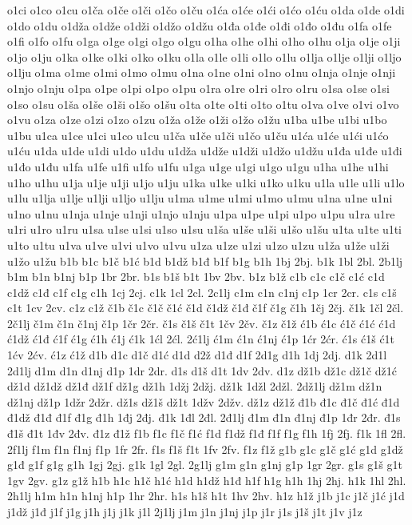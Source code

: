 {o1ci
o1co
o1cu
o1ča
o1če
o1či
o1čo
o1ču
o1ća
o1će
o1ći
o1ćo
o1ću
o1da
o1de
o1di
o1do
o1du
o1dža
o1dže
o1dži
o1džo
o1džu
o1đa
o1đe
o1đi
o1đo
o1đu
o1fa
o1fe
o1fi
o1fo
o1fu
o1ga
o1ge
o1gi
o1go
o1gu
o1ha
o1he
o1hi
o1ho
o1hu
o1ja
o1je
o1ji
o1jo
o1ju
o1ka
o1ke
o1ki
o1ko
o1ku
o1la
o1le
o1li
o1lo
o1lu
o1lja
o1lje
o1lji
o1ljo
o1lju
o1ma
o1me
o1mi
o1mo
o1mu
o1na
o1ne
o1ni
o1no
o1nu
o1nja
o1nje
o1nji
o1njo
o1nju
o1pa
o1pe
o1pi
o1po
o1pu
o1ra
o1re
o1ri
o1ro
o1ru
o1sa
o1se
o1si
o1so
o1su
o1ša
o1še
o1ši
o1šo
o1šu
o1ta
o1te
o1ti
o1to
o1tu
o1va
o1ve
o1vi
o1vo
o1vu
o1za
o1ze
o1zi
o1zo
o1zu
o1ža
o1že
o1ži
o1žo
o1žu
u1ba
u1be
u1bi
u1bo
u1bu
u1ca
u1ce
u1ci
u1co
u1cu
u1ča
u1če
u1či
u1čo
u1ču
u1ća
u1će
u1ći
u1ćo
u1ću
u1da
u1de
u1di
u1do
u1du
u1dža
u1dže
u1dži
u1džo
u1džu
u1đa
u1đe
u1đi
u1đo
u1đu
u1fa
u1fe
u1fi
u1fo
u1fu
u1ga
u1ge
u1gi
u1go
u1gu
u1ha
u1he
u1hi
u1ho
u1hu
u1ja
u1je
u1ji
u1jo
u1ju
u1ka
u1ke
u1ki
u1ko
u1ku
u1la
u1le
u1li
u1lo
u1lu
u1lja
u1lje
u1lji
u1ljo
u1lju
u1ma
u1me
u1mi
u1mo
u1mu
u1na
u1ne
u1ni
u1no
u1nu
u1nja
u1nje
u1nji
u1njo
u1nju
u1pa
u1pe
u1pi
u1po
u1pu
u1ra
u1re
u1ri
u1ro
u1ru
u1sa
u1se
u1si
u1so
u1su
u1ša
u1še
u1ši
u1šo
u1šu
u1ta
u1te
u1ti
u1to
u1tu
u1va
u1ve
u1vi
u1vo
u1vu
u1za
u1ze
u1zi
u1zo
u1zu
u1ža
u1že
u1ži
u1žo
u1žu
b1b
b1c
b1č
b1ć
b1d
b1dž
b1đ
b1f
b1g
b1h
1bj
2bj.
b1k
1bl
2bl.
2b1lj
b1m
b1n
b1nj
b1p
1br
2br.
b1s
b1š
b1t
1bv
2bv.
b1z
b1ž
c1b
c1c
c1č
c1ć
c1d
c1dž
c1đ
c1f
c1g
c1h
1cj
2cj.
c1k
1cl
2cl.
2c1lj
c1m
c1n
c1nj
c1p
1cr
2cr.
c1s
c1š
c1t
1cv
2cv.
c1z
c1ž
č1b
č1c
č1č
č1ć
č1d
č1dž
č1đ
č1f
č1g
č1h
1čj
2čj.
č1k
1čl
2čl.
2č1lj
č1m
č1n
č1nj
č1p
1čr
2čr.
č1s
č1š
č1t
1čv
2čv.
č1z
č1ž
ć1b
ć1c
ć1č
ć1ć
ć1d
ć1dž
ć1đ
ć1f
ć1g
ć1h
ć1j
ć1k
1ćl
2ćl.
2ć1lj
ć1m
ć1n
ć1nj
ć1p
1ćr
2ćr.
ć1s
ć1š
ć1t
1ćv
2ćv.
ć1z
ć1ž
d1b
d1c
d1č
d1ć
d1d
d2ž
d1đ
d1f
2d1g
d1h
1dj
2dj.
d1k
2d1l
2d1lj
d1m
d1n
d1nj
d1p
1dr
2dr.
d1s
d1š
d1t
1dv
2dv.
d1z
dž1b
dž1c
dž1č
dž1ć
dž1d
dž1dž
dž1đ
dž1f
dž1g
dž1h
1džj
2džj.
dž1k
1džl
2džl.
2dž1lj
dž1m
dž1n
dž1nj
dž1p
1džr
2džr.
dž1s
dž1š
dž1t
1džv
2džv.
dž1z
dž1ž
đ1b
đ1c
đ1č
đ1ć
đ1d
đ1dž
đ1đ
đ1f
đ1g
đ1h
1đj
2đj.
đ1k
1đl
2đl.
2đ1lj
đ1m
đ1n
đ1nj
đ1p
1đr
2đr.
đ1s
đ1š
đ1t
1đv
2đv.
đ1z
đ1ž
f1b
f1c
f1č
f1ć
f1d
f1dž
f1đ
f1f
f1g
f1h
1fj
2fj.
f1k
1fl
2fl.
2f1lj
f1m
f1n
f1nj
f1p
1fr
2fr.
f1s
f1š
f1t
1fv
2fv.
f1z
f1ž
g1b
g1c
g1č
g1ć
g1d
g1dž
g1đ
g1f
g1g
g1h
1gj
2gj.
g1k
1gl
2gl.
2g1lj
g1m
g1n
g1nj
g1p
1gr
2gr.
g1s
g1š
g1t
1gv
2gv.
g1z
g1ž
h1b
h1c
h1č
h1ć
h1d
h1dž
h1đ
h1f
h1g
h1h
1hj
2hj.
h1k
1hl
2hl.
2h1lj
h1m
h1n
h1nj
h1p
1hr
2hr.
h1s
h1š
h1t
1hv
2hv.
h1z
h1ž
j1b
j1c
j1č
j1ć
j1d
j1dž
j1đ
j1f
j1g
j1h
j1j
j1k
j1l
2j1lj
j1m
j1n
j1nj
j1p
j1r
j1s
j1š
j1t
j1v
j1z
}
